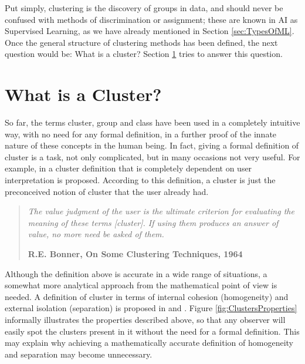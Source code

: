 Put simply, clustering is the discovery of groups in data, and should never be confused with methods of discrimination or assignment; these are known in \acs{AI} as Supervised Learning, as we have already mentioned in Section \ref{sec:TypesOfML}. Once the general structure of clustering methods has been defined, the next question would be: What is a cluster? Section \ref{sec:WhatIsCluster} tries to answer this question.

\section{What is a Cluster?} \label{sec:WhatIsCluster}

So far, the terms cluster, group and class have been used in a completely intuitive way, with no need for any formal definition, in a further proof of the innate nature of these concepts in the human being. In fact, giving a formal definition of cluster is a task, not only complicated, but in many occasions not very useful. For example, in \cite{lance1967general} a cluster definition that is completely dependent on user interpretation is proposed. According to this definition, a cluster is just the preconceived notion of cluster that the user already had.

\begin{quotation}{\slshape
		The value judgment of the user is the ultimate criterion for evaluating the meaning of these terms [cluster]. If using them produces an answer of value, no more need be asked of them.}
	\begin{flushright}
		\textbf{R.E. Bonner, On Some Clustering Techniques, 1964} 
	\end{flushright}
\end{quotation}

Although the definition above is accurate in a wide range of situations, a somewhat more analytical approach from the mathematical point of view is needed. A definition of cluster in terms of internal cohesion (homogeneity) and external isolation (separation) is proposed in \cite{cormack1971review} and \cite{gordon:1999}. Figure \ref{fig:ClustersProperties} informally illustrates the properties described above, so that any observer will easily spot the clusters present in it without the need for a formal definition. This may explain why achieving a mathematically accurate definition of homogeneity and separation may become unnecessary.

